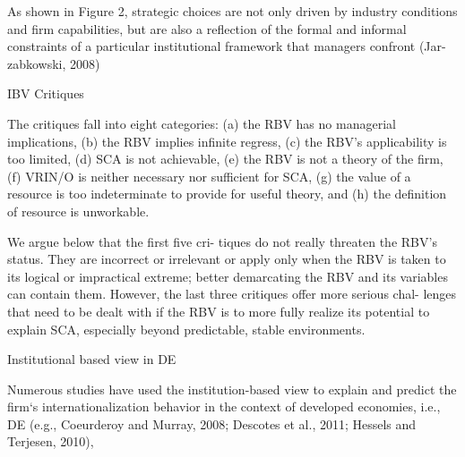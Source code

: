 As shown in Figure 2, strategic choices are not only driven by industry conditions and firm capabilities, but are also a reflection of the formal and informal constraints of a particular institutional framework that managers confront (Jar- zabkowski, 2008)



IBV Critiques

The critiques fall into eight categories: 
(a) the RBV has no managerial implications, 
(b) the RBV implies infinite regress, 
(c) the RBV’s applicability is too limited, 
(d) SCA is not achievable, 
(e) the RBV is not a theory of the firm, 
(f) VRIN/O is neither necessary nor sufficient for SCA, 
(g) the value of a resource is too indeterminate to provide for useful theory, and 
(h) the definition of resource is unworkable.


 We argue below that the first five cri- tiques do not really threaten the RBV’s status. They are incorrect or irrelevant or apply only when the RBV is taken to its logical or impractical extreme; better demarcating the RBV and its variables can contain them. However, the last three critiques offer more serious chal- lenges that need to be dealt with if the RBV is to more fully realize its potential to explain SCA, especially beyond predictable, stable environments.
 


Institutional based view in DE

Numerous studies have used the institution-based view to explain and predict the firm‘s internationalization behavior in the context of developed economies, i.e., DE (e.g., Coeurderoy and Murray, 2008; Descotes et al., 2011; Hessels and Terjesen, 2010),